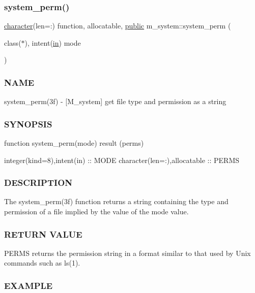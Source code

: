\subsubsection{\texorpdfstring{system\+\_\+perm()}{system\_perm()}}
{\footnotesize\ttfamily \hyperlink{option__stopwatch_83_8txt_abd4b21fbbd175834027b5224bfe97e66}{character}(len=\+:) function, allocatable, \hyperlink{M__stopwatch_83_8txt_a2f74811300c361e53b430611a7d1769f}{public} m\+\_\+system\+::system\+\_\+perm (\begin{DoxyParamCaption}\item[{class($\ast$), intent(\hyperlink{M__journal_83_8txt_afce72651d1eed785a2132bee863b2f38}{in})}]{mode }\end{DoxyParamCaption})}



\subsubsection*{N\+A\+ME}

system\+\_\+perm(3f) -\/ \mbox{[}M\+\_\+system\mbox{]} get file type and permission as a string 

\subsubsection*{S\+Y\+N\+O\+P\+S\+IS}

function system\+\_\+perm(mode) result (perms)

integer(kind=8),intent(in) \+:\+: M\+O\+DE character(len=\+:),allocatable \+:\+: P\+E\+R\+MS

\subsubsection*{D\+E\+S\+C\+R\+I\+P\+T\+I\+ON}

\begin{DoxyVerb}The system_perm(3f) function returns a string containing the type
and permission of a file implied by the value of the mode value.
\end{DoxyVerb}


\subsubsection*{R\+E\+T\+U\+RN V\+A\+L\+UE}

P\+E\+R\+MS returns the permission string in a format similar to that used by Unix commands such as ls(1).

\subsubsection*{E\+X\+A\+M\+P\+LE}


